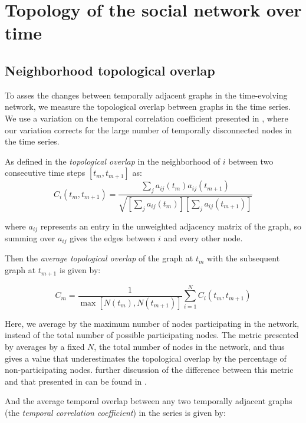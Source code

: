 \documentclass[12pt]{article}
\begin{document}
\section{Topology of the social network over time}

\subsection{Neighborhood topological overlap}
\label{sec:overlap}

To asses the changes between temporally adjacent graphs in the time-evolving network, we measure the topological overlap between graphs in the time series. We use a variation on the temporal correlation coefficient presented in \cite{3}, where our variation corrects for the large number of temporally disconnected nodes in the time series.

As defined in \cite{3}  the \emph{topological overlap} in the neighborhood of \(i\) between two consecutive time steps \([t_m,t_{m+1}]\) as:
\begin{equation}
C_i(t_m,t_{m+1}) = \frac{ \sum_j a_{ij}(t_m)a_{ij}(t_{m+1})}{\sqrt{[ \sum_j a_{ij}(t_m)][ \sum_j a_{ij}(t_{m+1})]}}
\label{eq:Ci}
\end{equation}

where \(a_{ij}\) represents an entry in the unweighted adjacency matrix of the graph, so summing over \(a_{ij}\) gives the edges between \(i\) and every other node.

Then the \emph{average topological overlap} of the graph at \(t_m\) with the subsequent graph at \(t_{m+1}\) is given by:

\begin{equation}
C_m = \frac{1}{\max [N(t_m),N(t_{m+1})]} \sum_{i = 1}^{N} C_i(t_m,t_{m+1})
\label{eq:Cm2}
\end{equation}

Here, we average by the maximum number of nodes participating in the network, instead of the total number of possible participating nodes. The metric presented by \cite{3} averages by a fixed \(N\), the total number of nodes in the network, and thus gives a value that underestimates the topological overlap by the percentage of non-participating nodes. further discussion of the difference between this metric and that presented in \cite{3} can be found in \cite{4}.

And the average temporal overlap between any two temporally adjacent graphs (the \emph{temporal correlation coefficient}) in the series is given by:
\end{document}

